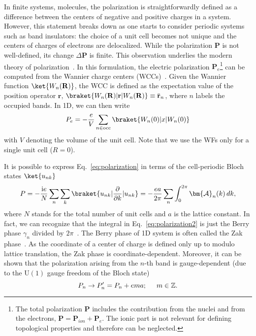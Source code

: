 In finite systems, \eg molecules, the polarization is straightforwardly defined as a difference between the centers of negative and positive charges in a system. However, this statement breaks down as one starts to consider periodic systems such as band insulators: the choice of a unit cell becomes not unique and the centers of charges of electrons are delocalized. While the polarization $\mathbf{P}$ is not well-defined, its change $\Delta \mathbf{P}$ is finite. This observation underlies the modern theory of polarization~\cite{doi:10.1080/00150199208016065, PhysRevB.48.4442, resta2007theory}. In this formulation, the electric polarization $\mathbf{P}_e$\footnote{The total polarization $\mathbf{P}$ includes the contribution from the nuclei and from the electrons, $\mathbf{P} = \mathbf{P}_{ion} + \mathbf{P}_e$. The ionic part is not relevant for defining topological properties and therefore can be neglected.} can be computed from the Wannier charge centers (WCCs)~\cite{MarziariWF2012}. Given the Wannier function $\ket{W_n (\mathbf{R})}$, the WCC is defined as the expectation value of the position operator $\mathbf{r}$, $\braket{W_n (\mathbf{R}) | \mathbf{r} | W_n (\mathbf{R})} \equiv \bar{\mathbf{r}}_n $, where $n$ labels the occupied bands. In 1D, we can then write
\begin{equation}
P_e = -\frac{e}{V} \sum_{n \in \mathrm{occ}} \braket{W_n (0)|x | W_n (0)}
\label{eq:polarization}
\end{equation}
with $V$ denoting the volume of the unit cell. Note that we use the WFs only for a single unit cell ($R =0$).

\hspace{-0.5cm}It is possible to express Eq.~\eqref{eq:polarization} in terms of the cell-periodic Bloch states $\ket{u_{nk}}$
\begin{equation}
P = -\frac{\mathrm{i}  e}{N} \sum_n \sum_k \braket{u_{nk} | \frac{\partial}{\partial k} | u_{nk}} = -\frac{e a}{2 \pi} \sum_n \int_0^{2 \pi} \bm{\mathcal{A}}_n (k)  \, dk,
\label{eq:polarization2}
\end{equation}
where $N$ stands for the total number of unit cells and $a$ is the lattice constant. In fact, we can recognize that the integral in Eq.~\ref{eq:polarization2} is just the Berry phase $\gamma_n$ divided by $2 \pi$~\cite{PhysRevB.48.4442}. The Berry phase of 1D system is often called the Zak phase~\cite{ZakPhase2}. As the coordinate of a center of charge is defined only up to modulo lattice translation, the Zak phase is coordinate-dependent. Moreover, it can be shown that the polarization arising from the $n$-th band is gauge-dependent (due to the $\mathrm{U}(1)$ gauge freedom of the Bloch state)
\begin{equation}
P_n  \rightarrow P_n' = P_n + ema; \hspace*{0.5cm} m \in \mathbb{Z}.
\end{equation}

